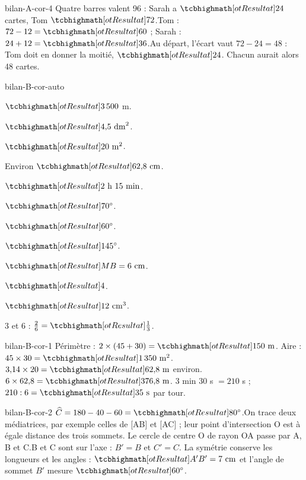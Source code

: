 \begin{blocEdition}{bilan-A-cor-4}
Quatre barres valent 96 : Sarah a $\res{24}$ cartes, Tom $\res{72}$.Tom : $72-12=\res{60}$ ; Sarah : $24+12=\res{36}$.Au départ, l’écart vaut $72-24=48$ : Tom doit en donner la moitié, $\res{24}$. Chacun aurait alors 48 cartes.
\end{blocEdition}
\begin{blocEdition}{bilan-B-cor-auto}
\begin{questions}
\item $\res{3\,500}$ m.
\item $\res{4{,}5\ \mathrm{dm}^2}$.
\item $\res{20\ \mathrm{m}^2}$.
\item Environ $\res{62{,}8\ \mathrm{cm}}$.
\item $\res{2\text{ h }15\text{ min}}$.
\item $\res{70^\circ}$.
\item $\res{60^\circ}$.
\item $\res{145^\circ}$.
\item $\res{MB=6\ \mathrm{cm}}$.
\item $\res4$.
\item $\res{12\ \mathrm{cm}^3}$.
\item 3 et 6 : $\frac26=\res{\frac13}$.\end{questions}
\end{blocEdition}
\begin{blocEdition}{bilan-B-cor-1}
Périmètre : $2\times(45+30)=\res{150\ \mathrm m}$. Aire : $45\times30=\res{1\,350\ \mathrm m^2}$.$3{,}14\times20=\res{62{,}8\ \mathrm m}$ environ.$6\times62{,}8=\res{376{,}8\ \mathrm m}$. 3 min 30 s $=210$ s ; $210:6=\res{35\ \mathrm s}$ par tour.
\end{blocEdition}
\begin{blocEdition}{bilan-B-cor-2}
$\widehat{C}=180-40-60=\res{80^\circ}$.On trace deux médiatrices, par exemple celles de [AB] et [AC] ; leur point d’intersection O est à égale distance des trois sommets. Le cercle de centre O de rayon OA passe par A, B et C.B et C sont sur l’axe : $B'=B$ et $C'=C$. La symétrie conserve les longueurs et les angles : $\res{A'B'=7\ \mathrm{cm}}$ et l’angle de sommet $B'$ mesure $\res{60^\circ}$.\label{fig-bilan-B-cor-2}

\end{blocEdition}
